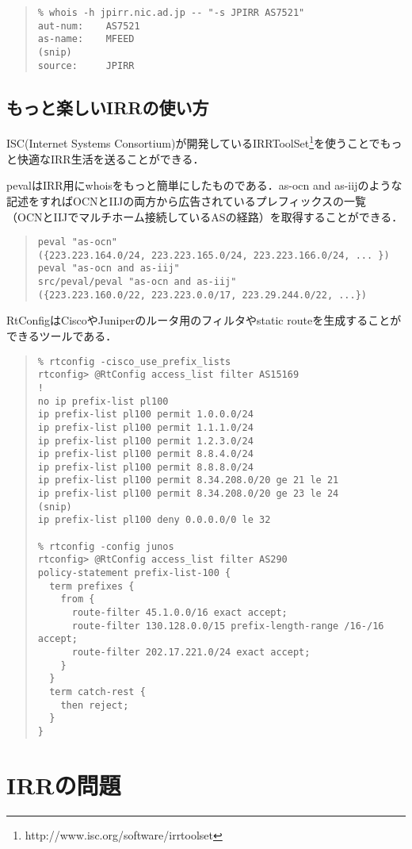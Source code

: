 \begin{quote}
\begin{minilinespace}
\begin{verbatim}
% whois -h jpirr.nic.ad.jp -- "-s JPIRR AS7521"
aut-num:    AS7521
as-name:    MFEED
(snip)
source:     JPIRR
\end{verbatim}
\end{minilinespace}
\end{quote}

\subsection{もっと楽しいIRRの使い方}

ISC(Internet Systems Consortium)が開発しているIRRToolSet\footnote{http://www.isc.org/software/irrtoolset}を使うことでもっと快適なIRR生活を送ることができる．

pevalはIRR用にwhoisをもっと簡単にしたものである．as-ocn and as-iijのような記述をすればOCNとIIJの両方から広告されているプレフィックスの一覧
（OCNとIIJでマルチホーム接続しているASの経路）を取得することができる．

\begin{quote}
\begin{minilinespace}
\begin{verbatim}
peval "as-ocn"
({223.223.164.0/24, 223.223.165.0/24, 223.223.166.0/24, ... })
peval "as-ocn and as-iij"
src/peval/peval "as-ocn and as-iij"
({223.223.160.0/22, 223.223.0.0/17, 223.29.244.0/22, ...})
\end{verbatim}
\end{minilinespace}
\end{quote}

RtConfigはCiscoやJuniperのルータ用のフィルタやstatic routeを生成することができるツールである．

\begin{quote}
\begin{minilinespace}
\begin{verbatim}
% rtconfig -cisco_use_prefix_lists
rtconfig> @RtConfig access_list filter AS15169
!
no ip prefix-list pl100
ip prefix-list pl100 permit 1.0.0.0/24
ip prefix-list pl100 permit 1.1.1.0/24
ip prefix-list pl100 permit 1.2.3.0/24
ip prefix-list pl100 permit 8.8.4.0/24
ip prefix-list pl100 permit 8.8.8.0/24
ip prefix-list pl100 permit 8.34.208.0/20 ge 21 le 21
ip prefix-list pl100 permit 8.34.208.0/20 ge 23 le 24
(snip)
ip prefix-list pl100 deny 0.0.0.0/0 le 32

% rtconfig -config junos
rtconfig> @RtConfig access_list filter AS290
policy-statement prefix-list-100 {
  term prefixes {
    from {
      route-filter 45.1.0.0/16 exact accept;
      route-filter 130.128.0.0/15 prefix-length-range /16-/16 accept;
      route-filter 202.17.221.0/24 exact accept;
    }
  }
  term catch-rest {
    then reject;
  }
}
\end{verbatim}
\end{minilinespace}
\end{quote}

\section{IRRの問題}


